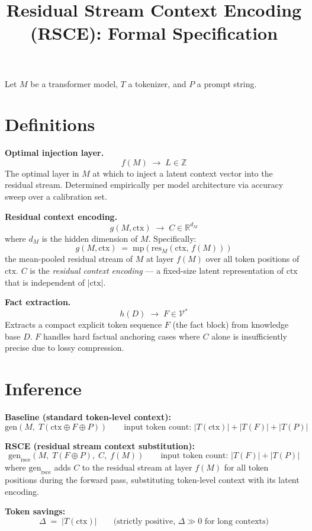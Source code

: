 \documentclass[11pt]{article}
\title{Residual Stream Context Encoding (RSCE): Formal Specification}
\date{}
\newcommand{\gen}{\mathrm{gen}}
\newcommand{\geni}{\mathrm{gen}_{\mathrm{rsce}}}
\newcommand{\mpool}{\mathrm{mp}}
\newcommand{\res}{\mathrm{res}}
\newcommand{\ctx}{\mathrm{ctx}}
\begin{document}
\maketitle

Let $M$ be a transformer model, $T$ a tokenizer, and $P$ a prompt string.

\section*{Definitions}

\textbf{Optimal injection layer.}
\[
    f(M) \;\rightarrow\; L \in \mathbb{Z}
\]
The optimal layer in $M$ at which to inject a latent context vector into the
residual stream. Determined empirically per model architecture via accuracy
sweep over a calibration set.

\medskip
\textbf{Residual context encoding.}
\[
    g(M, \ctx) \;\rightarrow\; C \in \mathbb{R}^{d_M}
\]
where $d_M$ is the hidden dimension of $M$. Specifically:
\[
    g(M, \ctx) \;=\; \mpool\!\left(\res_M\!\left(\ctx,\, f(M)\right)\right)
\]
the mean-pooled residual stream of $M$ at layer $f(M)$ over all token
positions of $\ctx$. $C$ is the \emph{residual context encoding} — a
fixed-size latent representation of $\ctx$ that is independent of
$|\ctx|$.

\medskip
\textbf{Fact extraction.}
\[
    h(D) \;\rightarrow\; F \in \mathcal{V}^*
\]
Extracts a compact explicit token sequence $F$ (the fact block) from
knowledge base $D$. $F$ handles hard factual anchoring cases where $C$
alone is insufficiently precise due to lossy compression.

\section*{Inference}

\textbf{Baseline (standard token-level context):}
\[
    \gen\!\left(M,\; T(\ctx \oplus F \oplus P)\right)
    \qquad
    \text{input token count: } |T(\ctx)| + |T(F)| + |T(P)|
\]

\medskip
\textbf{RSCE (residual stream context substitution):}
\[
    \geni\!\left(M,\; T(F \oplus P),\; C,\; f(M)\right)
    \qquad
    \text{input token count: } |T(F)| + |T(P)|
\]
where $\geni$ adds $C$ to the residual stream at layer $f(M)$ for all
token positions during the forward pass, substituting token-level context
with its latent encoding.

\medskip
\textbf{Token savings:}
\[
    \Delta \;=\; |T(\ctx)| \qquad \text{(strictly positive, } \Delta \gg 0 \text{ for long contexts)}
\]
\end{document}
